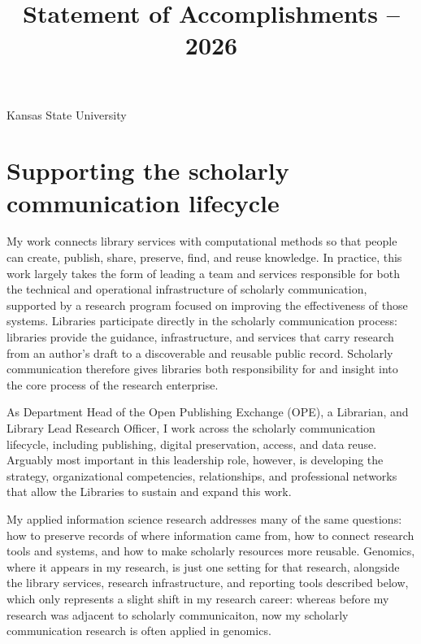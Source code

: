 \title{Statement of Accomplishments -- 2026}
\address{University Library}{Kansas State University}
\portfoliotitle

\begingroup
\evidencelinksfalse
\setlength{\parindent}{1.5em}
\setlength{\parskip}{0.45em}

\section{Supporting the scholarly communication lifecycle}
My work connects library services with computational methods so that people can create, publish, share, preserve, find, and reuse knowledge. In practice, this work largely takes the form of leading a team and services responsible for both the technical and operational infrastructure of scholarly communication, supported by a research program focused on improving the effectiveness of those systems. Libraries participate directly in the scholarly communication process: libraries provide the guidance, infrastructure, and services that carry research from an author’s draft to a discoverable and reusable public record. Scholarly communication therefore gives libraries both responsibility for and insight into the core process of the research enterprise.

As Department Head of the Open Publishing Exchange (OPE), a Librarian, and Library Lead Research Officer, I work across the scholarly communication lifecycle, including publishing, digital preservation, access, and data reuse. Arguably most important in this leadership role, however, is developing the strategy, organizational competencies, relationships, and professional networks that allow the Libraries to sustain and expand this work.

My applied information science research addresses many of the same questions: how to preserve records of where information came from, how to connect research tools and systems, and how to make scholarly resources more reusable. Genomics, where it appears in my research, is just one setting for that research, alongside the library services, research infrastructure, and reporting tools described below, which only represents a slight shift in my research career: whereas before my research was adjacent to scholarly communicaiton, now my scholarly communication research is often applied in genomics.

